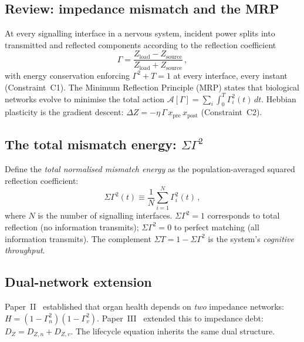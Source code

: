 ﻿\documentclass[aps,pre,twocolumn,superscriptaddress,floatfix]{revtex4-2}
\begin{document}
\subsection{Review: impedance mismatch and the MRP}

At every signalling interface in a nervous system,
incident power splits into transmitted and reflected
components according to the reflection coefficient
\begin{equation}
  \Gamma = \frac{Z_{\mathrm{load}} - Z_{\mathrm{source}}}
               {Z_{\mathrm{load}} + Z_{\mathrm{source}}}\,,
  \label{eq:gamma}
\end{equation}
with energy conservation enforcing $\Gamma^2 + T = 1$
at every interface, every instant (Constraint~C1).
The Minimum Reflection Principle (MRP) states that
biological networks evolve to minimise the total action
$\mathcal{A}[\Gamma] = \sum_i \int_0^T \Gamma_i^2(t)\,dt$.
Hebbian plasticity is the gradient descent:
$\Delta Z = -\eta\,\Gamma\,x_{\mathrm{pre}}\,
x_{\mathrm{post}}$ (Constraint~C2).

\subsection{The total mismatch energy: $\Sigma\Gamma^2$}

Define the \emph{total normalised mismatch energy}
as the population-averaged squared reflection coefficient:
\begin{equation}
  \Sigma\Gamma^2(t) \equiv
    \frac{1}{N} \sum_{i=1}^{N} \Gamma_i^2(t)\,,
  \label{eq:sigma-gamma}
\end{equation}
where $N$ is the number of signalling interfaces.
$\Sigma\Gamma^2 = 1$ corresponds to total reflection
(no information transmits); $\Sigma\Gamma^2 = 0$
to perfect matching (all information transmits).
The complement $\Sigma T = 1 - \Sigma\Gamma^2$ is
the system's \emph{cognitive throughput}.


\subsection{Dual-network extension}
\label{sec:dual-lifecycle}

Paper~II~\cite{PaperII} established that organ health depends
on \emph{two} impedance networks:
$H = (1-\Gamma_n^2)(1-\Gamma_v^2)$.
Paper~III~\cite{PaperIII} extended this to impedance debt:
$D_Z = D_{Z,n} + D_{Z,v}$.
The lifecycle equation inherits the same dual structure.
\end{document}
